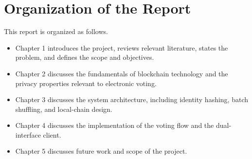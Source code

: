\section[Organization of the Report]{\textbf{Organization of the Report}}
This report is organized as follows.
\begin{itemize}
    \item Chapter 1 introduces the project, reviews relevant literature, states the problem, and defines the scope and objectives.
    \item Chapter 2 discusses the fundamentals of blockchain technology and the privacy properties relevant to electronic voting.
    \item Chapter 3 discusses the system architecture, including identity hashing, batch shuffling, and local-chain design.
    \item Chapter 4 discusses the implementation of the voting flow and the dual-interface client.
    \item Chapter 5 discusses future work and scope of the project.
\end{itemize}